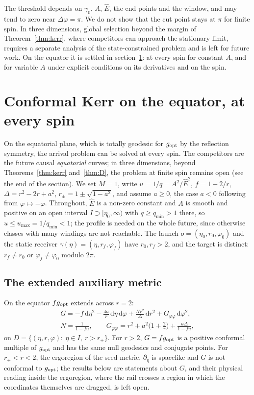 \documentclass[aip,jmp,amsmath,amssymb,reprint]{revtex4-2}
\newcommand{\Ehat}{\hat E}
\newcommand{\dd}{\mathrm{d}}
\newcommand{\gopt}{g_{\rm opt}}
\theoremstyle{plain}
\theoremstyle{definition}
\begin{document}
The threshold depends on $\gamma_0$, $A$, $\Ehat$, the end points and the window, and may tend
to zero near $\Delta\varphi=\pi$. We do not show that the cut point stays at $\pi$ for finite spin.
In three dimensions, global selection beyond the margin of Theorem~\ref{thm:kerr}, where
competitors can approach the stationary limit, requires a separate
analysis of the state-constrained problem and is left for future work. On the equator it is
settled in section~\ref{sec:kerr-eq}: at every spin for constant $A$, and for variable $A$ under
explicit conditions on its derivatives and on the spin.

\section{Conformal Kerr on the equator, at every spin}
\label{sec:kerr-eq}
On the equatorial plane, which is totally geodesic for $\gopt$ by the reflection symmetry, the
arrival problem can be solved at every spin. The competitors are the future causal
\emph{equatorial} curves; in three dimensions, beyond Theorems~\ref{thm:kerr} and~\ref{thm:D}, the problem
at finite spin remains open (see the end of the section). We set $M=1$, write $u=1/q=A^2/\Ehat^2$, $f=1-2/r$, $\Delta=r^2-2r+a^2$,
$r_\pm=1\pm\sqrt{1-a^2}$, and assume $a\ge0$, the case $a<0$ following from $\varphi\mapsto-\varphi$.
Throughout, $\Ehat$ is a non-zero constant and $A$ is smooth and positive on an open interval
$I\supset[\eta_0,\infty)$ with $q\ge q_{\min}>1$ there, so $u\le u_{\max}=1/q_{\min}<1$; the profile is
needed on the whole future, since otherwise classes with many windings are not reachable. The
launch $o=(\eta_0,r_0,\varphi_0)$ and the static receiver $\gamma(\eta)=(\eta,r_f,\varphi_f)$ have
$r_0,r_f>2$, and the target is distinct: $r_f\ne r_0$ or $\varphi_f\ne\varphi_0$ modulo $2\pi$.

\subsection{The extended auxiliary metric}

On the equator $f\gopt$ extends across $r=2$:
\begin{equation}
\begin{gathered}
  G=-f\,\dd\eta^2-\frac{4a}r\,\dd\eta\,\dd\varphi+\frac{Nr^2}\Delta\,\dd r^2+G_{\varphi\varphi}\,\dd\varphi^2,\\
  N=\frac1{1-fu},\qquad
  G_{\varphi\varphi}=r^2+a^2\Big(1+\frac2r\Big)+\frac{u\Delta}{1-fu},
\end{gathered}
  \label{eq:kerr-G}
\end{equation}
on $D=\{(\eta,r,\varphi):\ \eta\in I,\ r>r_+\}$. For $r>2$, $G=f\gopt$ is a positive conformal multiple of
$\gopt$ and has the same null geodesics and conjugate points. For $r_+<r<2$, the ergoregion of the
seed metric, $\partial_\eta$ is spacelike and $G$ is not conformal to $\gopt$; the results below are
statements about $G$, and their physical reading inside the ergoregion, where the rail crosses
a region in which the coordinates themselves are dragged, is left open.
\end{document}
